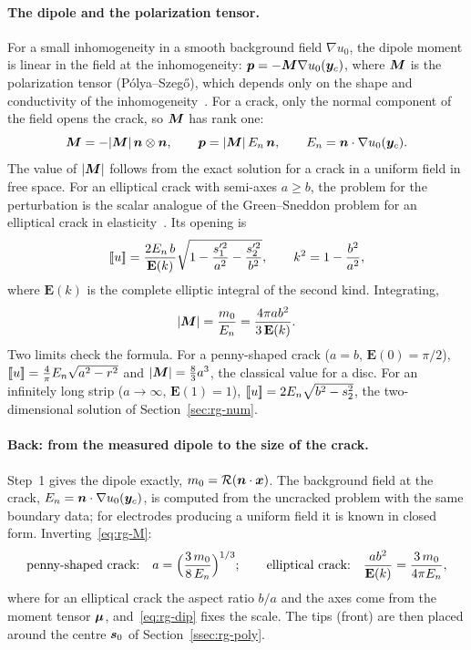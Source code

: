 \paragraph{The dipole and the polarization tensor.} For a small inhomogeneity in a smooth background field $\nabla u_0$, the dipole moment is linear in the field at the inhomogeneity: $\bm{p}=-\bm{M}\nabla u_0(\bm{y}_c)$, where $\bm{M}$ is the polarization tensor (Pólya--Szegő), which depends only on the shape and conductivity of the inhomogeneity~\cite{AK04}. For a crack, only the normal component of the field opens the crack, so $\bm{M}$ has rank one:
\[
\bm{M}=-|\bm{M}|\,\bm{n}\otimes\bm{n},\qquad \bm{p}=|\bm{M}|\,E_n\,\bm{n},\qquad E_n=\bm{n}\cdot\nabla u_0(\bm{y}_c).
\]
The value of $|\bm{M}|$ follows from the exact solution for a crack in a uniform field in free space. For an elliptical crack with semi-axes $a\ge b$, the problem for the perturbation is the scalar analogue of the Green--Sneddon problem for an elliptical crack in elasticity~\cite{GS50}. Its opening is
\begin{equation}\label{eq:rg-ellopen}
[\![u]\!]=\frac{2E_n\,b}{\mathbf E(k)}\sqrt{1-\frac{s_1'^2}{a^2}-\frac{s_2'^2}{b^2}},\qquad k^2=1-\frac{b^2}{a^2},
\end{equation}
where $\mathbf E(k)$ is the complete elliptic integral of the second kind. Integrating,
\begin{equation}\label{eq:rg-M}
|\bm{M}|=\frac{m_0}{E_n}=\frac{4\pi ab^2}{3\,\mathbf E(k)} .
\end{equation}
Two limits check the formula. For a penny-shaped crack ($a=b$, $\mathbf E(0)=\pi/2$), $[\![u]\!]=\tfrac4\pi E_n\sqrt{a^2-r^2}$ and $|\bm{M}|=\tfrac83a^3$, the classical value for a disc. For an infinitely long strip ($a\to\infty$, $\mathbf E(1)=1$), $[\![u]\!]=2E_n\sqrt{b^2-s_2^2}$, the two-dimensional solution of Section~\ref{sec:rg-num}.

\paragraph{Back: from the measured dipole to the size of the crack.} Step~1 gives the dipole exactly, $m_0=\mathcal{R}(\bm{n}\cdot\bm{x})$. The background field at the crack, $E_n=\bm{n}\cdot\nabla u_0(\bm{y}_c)$, is computed from the uncracked problem with the same boundary data; for electrodes producing a uniform field it is known in closed form. Inverting~\eqref{eq:rg-M}:
\begin{equation}\label{eq:rg-dip}
\text{penny-shaped crack:}\quad a=\Bigl(\frac{3\,m_0}{8\,E_n}\Bigr)^{1/3};\qquad
\text{elliptical crack:}\quad \frac{ab^2}{\mathbf E(k)}=\frac{3\,m_0}{4\pi E_n},
\end{equation}
where for an elliptical crack the aspect ratio $b/a$ and the axes come from the moment tensor $\bm{\mu}$, and~\eqref{eq:rg-dip} fixes the scale. The tips (front) are then placed around the centre $\bm{s}_0$ of Section~\ref{ssec:rg-poly}.

